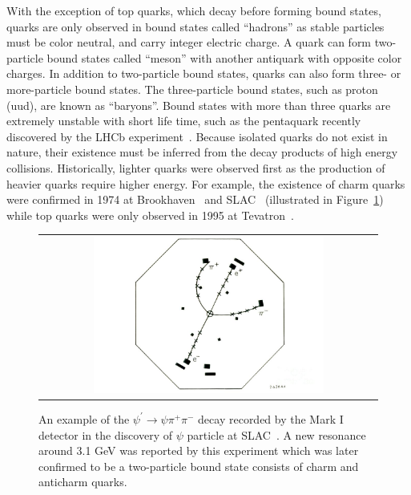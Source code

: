 With the exception of top quarks, which decay before forming bound states, quarks are only observed in bound states called ``hadrons'' as stable particles must be color neutral, and carry integer electric charge. A quark can form two-particle bound states called ``meson'' with another antiquark with opposite color charges. In addition to two-particle bound states, quarks can also form three- or more-particle bound states. The three-particle bound states, such as proton (uud), are known as ``baryons''. Bound states with more than three quarks are extremely unstable with short life time, such as the pentaquark recently discovered by the \ac{LHCb} experiment~\cite{LHCb:2015yax}. Because isolated quarks do not exist in nature, their existence must be inferred from the decay products of high energy collisions. Historically, lighter quarks were observed first as the production of heavier quarks require higher energy. For example, the existence of charm quarks were confirmed in 1974 at Brookhaven~\cite{E598:1974sol} and SLAC~\cite{SLAC-SP-017:1974ind} (illustrated in Figure~\ref{fig:JPsi}) while top quarks were only observed in 1995 at Tevatron~\cite{CDF:1995wbb,D0:1995jca}.

\begin{figure}[tbh!]
 \begin{center}
 \begin{tabular}{c}
 \includegraphics[width=0.7\textwidth]{figures/Part1/Field/J}
 \end{tabular}
 \caption{An example of the $\psi^{\prime}\rightarrow\psi\pi^{+}\pi^{-}$ decay recorded by the Mark I detector in the discovery of $\psi$ particle at SLAC~\cite{SLAC-SP-017:1974ind}. A new resonance around 3.1 GeV was reported by this experiment which was later confirmed to be a two-particle bound state consists of charm and anticharm quarks.}
 \label{fig:JPsi}
 \end{center}
\end{figure}


